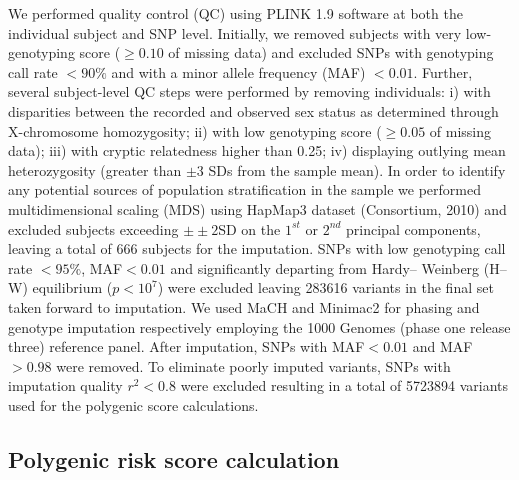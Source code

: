 We performed quality control (QC) using PLINK 1.9 software at both the individual subject and SNP level. Initially, we removed subjects with very low-genotyping score ($\geq 0.10$ of missing data) and excluded SNPs with genotyping call rate $<90\%$ and with a minor allele frequency (MAF) $< 0.01$. Further, several subject-level QC steps were performed by removing individuals: i) with disparities between the recorded and observed sex status as determined through X-chromosome homozygosity; ii) with low genotyping score ($\geq 0.05$ of missing data); iii) with cryptic relatedness higher than 0.25; iv) displaying outlying mean heterozygosity (greater than $\pm3$ SDs from the sample mean). In order to identify any potential sources of population stratification in the sample we performed multidimensional scaling (MDS) using HapMap3 dataset (Consortium, 2010) and excluded subjects exceeding $\pm±2$SD on the $1^{st}$ or $2^{nd}$ principal components, leaving a total of 666 subjects for the imputation. SNPs with low genotyping call rate $<95\%$, MAF$<0.01$ and significantly departing from Hardy– Weinberg (H–W) equilibrium ($p<10^{7}$) were excluded leaving \num{283 616} variants in the final set taken forward to imputation. We used MaCH and Minimac2 for phasing and genotype imputation respectively employing the 1000 Genomes (phase one release three) reference panel. After imputation, SNPs with MAF$<0.01$ and MAF$>0.98$ were removed. To eliminate poorly imputed variants, SNPs with imputation quality $r^{2} < 0.8$ were excluded resulting in a total of \num{5723894} variants used for the polygenic score calculations. 

\subsection{Polygenic risk score calculation}

